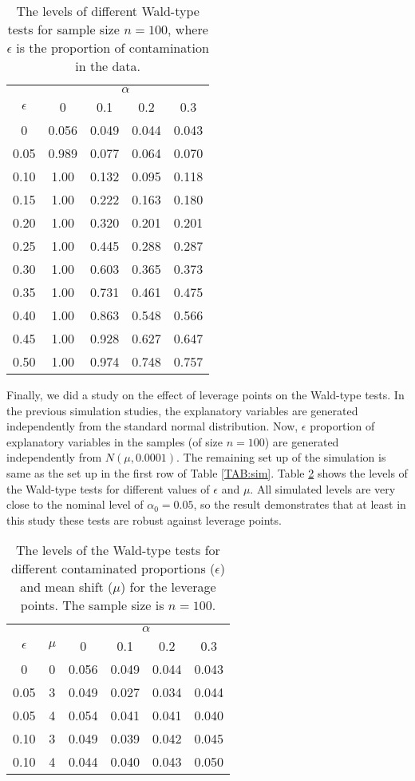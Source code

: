\documentclass[a4paper]{article}%
\begin{document}
\begin{table}[h]
	\caption{The levels of different Wald-type tests  for sample size $n=100$, where $\epsilon$ is the proportion of contamination in the data.}%
	\label{TAB:sim2}
	\centering
	\begin{tabular}
		[c]{|c|cccc|}\hline
		&\multicolumn{4}{c|}{$\alpha$}\\
		$\epsilon$  & 0  & 0.1 & 0.2 & 0.3 \\ \hline
		0 & 0.056 &	0.049 &	0.044 &	0.043\\
		0.05 & 0.989 &	0.077 &	0.064 &	0.070\\
		0.10 & 1.00 &	0.132 &	0.095 &	0.118\\
		0.15 & 1.00  & 0.222 & 0.163 & 0.180\\
		0.20 & 1.00 &	0.320 &	0.201 &	0.201\\
		0.25 & 1.00 & 0.445 & 0.288 & 0.287\\
		0.30 & 1.00 &	0.603 &	0.365 &	0.373\\
		0.35 & 1.00 & 0.731 & 0.461 & 0.475\\
		0.40 & 1.00 &	0.863 &	0.548 &	0.566\\
		0.45 & 1.00 & 0.928 & 0.627 & 0.647\\
		0.50 & 1.00 &	0.974 &	0.748 &	0.757		
		\\\hline
	\end{tabular}
\end{table}

Finally, we did a study on the effect of leverage points on the Wald-type tests. 
In the previous simulation studies, the explanatory variables are generated independently from the standard normal distribution. 
Now, $\epsilon$ proportion of explanatory variables in the samples (of size $n=100$) are generated independently from $N(\mu, 0.0001)$. 
The remaining set up of the simulation is same as the set up in the first row of Table \ref{TAB:sim}. 
Table \ref{TAB:sim4} shows the levels of the Wald-type tests for different values of $\epsilon$ and $\mu$. 
All simulated levels are very close to the nominal level of $\alpha_0=0.05$, 
so the result demonstrates that at least in this study these tests are robust against  leverage points. 

\begin{table}[h]
	\caption{The levels of the Wald-type tests for different contaminated proportions ($\epsilon$) and mean shift ($\mu$) for the leverage points.  The sample size is $n=100$.}%
	\label{TAB:sim4}
	\centering
	\begin{tabular}
		[c]{|c|c|cccc|}\hline
		&&\multicolumn{4}{c|}{$\alpha$}\\
		$\epsilon$ & $\mu$  & 0  & 0.1 & 0.2 & 0.3 \\ \hline
		0 & 0 & 0.056 &	0.049 &	0.044 &	0.043\\
		0.05 & 3 & 0.049 & 0.027 & 0.034 & 0.044\\
		0.05 & 4 & 0.054 & 0.041 & 0.041 & 0.040\\
		0.10 & 3 & 0.049 & 0.039 & 0.042 & 0.045\\
		0.10 & 4 & 0.044 & 0.040 & 0.043 & 0.050		
		\\\hline
	\end{tabular}
\end{table}
\end{document}
